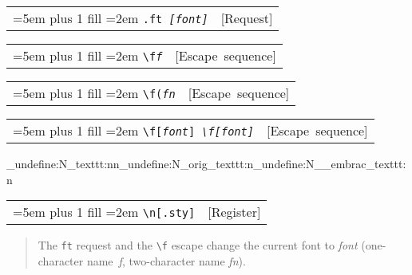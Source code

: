 \documentclass{book}
\newcommand\GNUTexinfocommandstyletextvar[1]{{\normalfont{}\textsl{#1}}}%
\begin{document}
\noindent\begin{tabularx}{\linewidth}{@{}Xr}
\rightskip=5em plus 1 fill
\hangindent=2em
\noindent\texttt{\texttt{.ft} \EmbracOn{}\textnormal{\textsl{[\EmbracOff{}\textnormal{\textsl{font}}\EmbracOn{}]}}\EmbracOff{}}& [Request]
\end{tabularx}

%

\noindent\begin{tabularx}{\linewidth}{@{}Xr}
\rightskip=5em plus 1 fill
\hangindent=2em
\noindent\texttt{\texttt{\textbackslash{}f}\textnormal{\textsl{f}}\texttt{}}& [Escape~sequence]
\end{tabularx}

%

\noindent\begin{tabularx}{\linewidth}{@{}Xr}
\rightskip=5em plus 1 fill
\hangindent=2em
\noindent\texttt{\texttt{\textbackslash{}f(}\textnormal{\textsl{fn}}\texttt{}}& [Escape~sequence]
\end{tabularx}

%

%
\noindent\begin{tabularx}{\linewidth}{@{}Xr}
\rightskip=5em plus 1 fill
\hangindent=2em
\noindent\texttt{\texttt{\textbackslash{}f[}\textnormal{\textsl{font}}\texttt{]} \EmbracOn{}\textnormal{\textsl{\texttt{\textbackslash{}f[}\EmbracOff{}\textnormal{\textsl{font}}\EmbracOn{}\texttt{]}}}\EmbracOff{}}& [Escape~sequence]
\end{tabularx}
\ExplSyntaxOn%
\cs_undefine:N{\embrac_texttt:nn}\cs_undefine:N{\embrac_orig_texttt:n}\cs_undefine:N{\__embrac_texttt:n}%
\ExplSyntaxOff%

%

\noindent\begin{tabularx}{\linewidth}{@{}Xr}
\rightskip=5em plus 1 fill
\hangindent=2em
\noindent\texttt{\texttt{\textbackslash{}n[.sty]}}& [Register]
\end{tabularx}

%
\begin{quote}
\unskip{\parskip=0pt\noindent}%
The \texttt{ft} request and the \texttt{\textbackslash{}f} escape change the current font
to \GNUTexinfocommandstyletextvar{font} (one-character name~\GNUTexinfocommandstyletextvar{f}, two-character name
\GNUTexinfocommandstyletextvar{fn}).
\end{quote}
\end{document}
